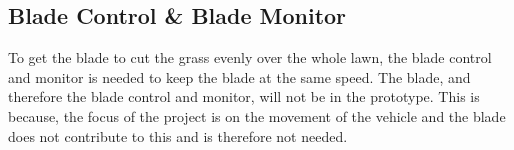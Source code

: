 \subsection{Blade Control \& Blade Monitor}
To get the blade to cut the grass evenly over the whole lawn, the blade control and monitor is needed to keep the blade at the same speed.
The blade, and therefore the blade control and monitor, will not be in the prototype. This is because, the focus of the project is on the movement of the vehicle and the blade does not contribute to this and is therefore not needed.
